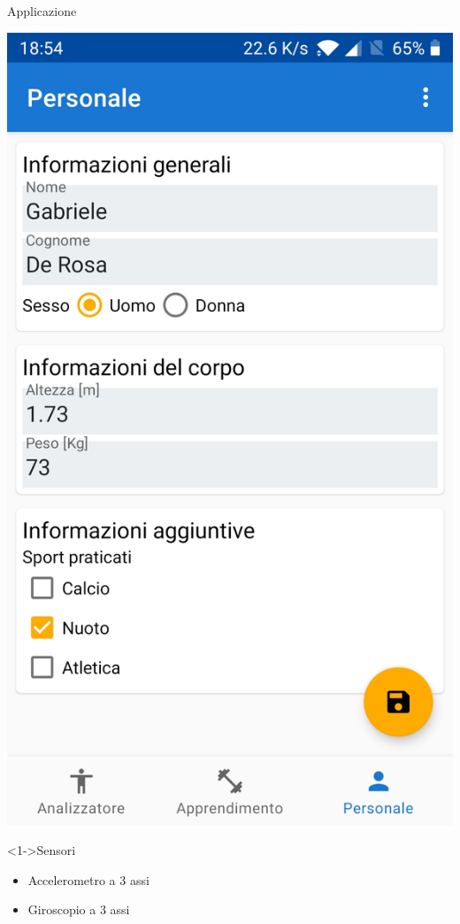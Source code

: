\begin{tframe}{Applicazione}
\begin{minipage}{0.65\textwidth}
        \centering\includegraphics[scale = 0.06]{assets/images/screenshots/form.jpg}

    \end{minipage}%

    \begin{block}<1->{Sensori}
        
        \begin{itemize}
            \item Accelerometro a 3 assi
            \item Giroscopio a 3 assi
        \end{itemize}
        
    \end{block}

\end{tframe}